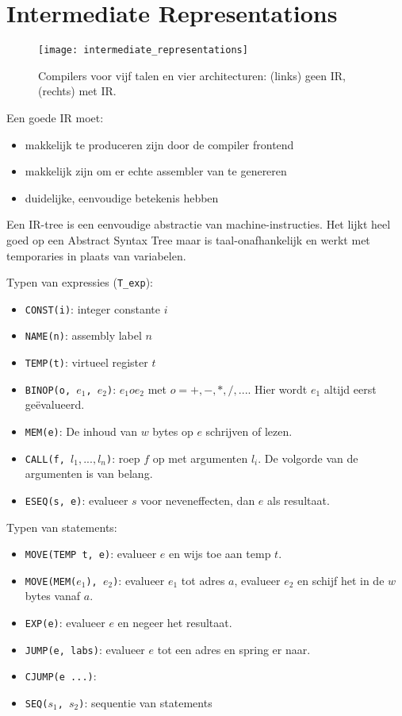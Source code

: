 
\chapter{Intermediate Representations}
\begin{figure}[ht]
	\texttt{[image: intermediate\_representations]}
	\caption{Compilers voor vijf talen en vier architecturen: 
		(links) geen IR, (rechts) met IR.}
	\label{fig:intermediate_representations}
\end{figure}
Een goede IR moet:
\begin{itemize}
	\item makkelijk te produceren zijn door de compiler frontend
	\item makkelijk zijn om er echte assembler van te genereren
	\item duidelijke, eenvoudige betekenis hebben
\end{itemize}

Een IR-tree is een eenvoudige abstractie van machine-instructies. Het lijkt heel goed op een Abstract Syntax Tree maar is taal-onafhankelijk en werkt met temporaries in plaats van variabelen.

Typen van expressies (\texttt{T\_exp}):
\begin{itemize}
	\item \texttt{CONST(i)}: integer constante $i$
	\item \texttt{NAME(n)}: assembly label $n$
	\item \texttt{TEMP(t)}: virtueel register $t$
	\item \texttt{BINOP(o, $e_1$, $e_2$)}: $e_1 o e_2$ met $o = +, -, *, /, ...$. Hier wordt $e_1$ altijd eerst geëvalueerd.
	\item \texttt{MEM(e)}: De inhoud van $w$ bytes op $e$ schrijven of lezen.
	\item \texttt{CALL(f, $l_1, ..., l_n$)}: roep $f$ op met argumenten $l_i$. De volgorde van de argumenten is van belang.
	\item \texttt{ESEQ(s, e)}: evalueer $s$ voor neveneffecten, dan $e$ als resultaat.
\end{itemize}

Typen van statements:
\begin{itemize}
	\item \texttt{MOVE(TEMP t, e)}: evalueer $e$ en wijs toe aan temp $t$.
	\item \texttt{MOVE(MEM($e_1$), $e_2$)}: evalueer $e_1$ tot adres $a$, evalueer $e_2$ en schijf het in de $w$ bytes vanaf $a$.
	\item \texttt{EXP(e)}: evalueer $e$ en negeer het resultaat.
	\item \texttt{JUMP(e, labs)}: evalueer $e$ tot een adres en spring er naar. 
	\item \texttt{CJUMP(e ...)}:
	\item \texttt{SEQ($s_1$, $s_2$)}: sequentie van statements 
\end{itemize}

